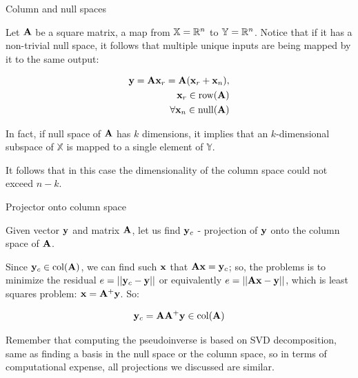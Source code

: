 \documentclass{beamer}
\begin{document}
\begin{frame}{Column and null spaces}
	\begin{flushleft}
		
		Let $\mathbf{A}$ be a square matrix, a map from $\mathbb{X} = \mathbb{R}^n$ to $\mathbb{Y} = \mathbb{R}^n$. 
		Notice that if it has a non-trivial null space, it follows that multiple unique inputs are being mapped by it to the same output:
		
		\begin{equation}
			\begin{aligned}
				\mathbf{y} = \mathbf{A} \mathbf{x}_r = \mathbf{A} (\mathbf{x}_r + \mathbf{x}_n), \\
				\mathbf{x}_r \in \text{row}(\mathbf{A}) \\
				\forall \mathbf{x}_n \in \text{null}(\mathbf{A}) \\
			\end{aligned}
		\end{equation}
		
		In fact, if null space of $\mathbf{A}$ has $k$ dimensions, it implies that an $k$-dimensional subspace of $\mathbb{X}$ is mapped to a single element of $\mathbb{Y}$. 
		
		\bigskip
		
		It follows that in this case the dimensionality of the column space could not exceed $n-k$.
		
	\end{flushleft}
\end{frame}



\begin{frame}{Projector onto column space}
	\begin{flushleft}
		
		Given vector $\mathbf{y}$ and matrix $\mathbf{A}$, let us find $\mathbf{y}_c$ - projection of $\mathbf{y}$ onto the column space of $\mathbf{A}$.
		
		\bigskip
		
		Since $\mathbf{y}_c \in \text{col}(\mathbf{A})$, we can find such $\mathbf{x}$ that $\mathbf{A}\mathbf{x} = \mathbf{y}_c$; so, the problems is to minimize the residual $e = || \mathbf{y}_c - \mathbf{y} ||$ or equivalently $e =  || \mathbf{A}\mathbf{x} - \mathbf{y} ||$, which is least squares problem: $\mathbf{x} = \mathbf{A}^+ \mathbf{y}$. So:
		
		\begin{equation}
			\mathbf{y}_c = \mathbf{A}\mathbf{A}^+ \mathbf{y} \in \text{col}(\mathbf{A})
		\end{equation}
		
		Remember that computing the pseudoinverse is based on SVD decomposition, same as finding a basis in the null space or the column space, so in terms of computational expense, all projections we discussed are similar.
		
	\end{flushleft}
\end{frame}
\end{document}
